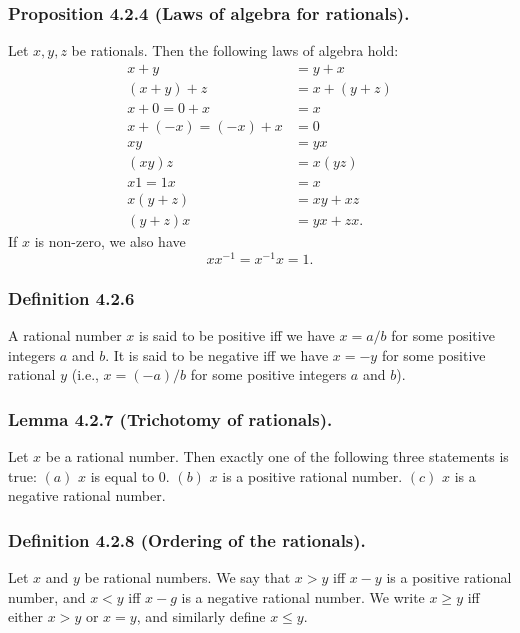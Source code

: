 \documentclass[12pt, letter]{article}
\begin{document}
\subsubsection*{Proposition 4.2.4 (Laws of algebra for rationals).}
Let $x,y,z$ be rationals. Then the following laws of algebra hold:
\begin{equation*}
    \begin{aligned}
        x+y&=y+x\\
        (x+y)+z&=x+(y+z)\\
        x+0=0+x&=x\\
        x+(-x)=(-x)+x&=0\\
        xy&=yx\\
        (xy)z&=x(yz)\\
        x1=1x&=x\\
        x(y+z)&=xy+xz\\
        (y+z)x&=yx+zx.
    \end{aligned}
\end{equation*}
If $x$ is non-zero, we also have
\begin{equation*}
    xx^{-1}=x^{-1}x=1.
\end{equation*}
\subsubsection*{Definition 4.2.6}
A rational number $x$ is said to be positive iff we have $x=a/b$ for some positive integers $a$ and $b$. It is said to be negative iff we have $x=-y$ for some 
positive rational $y$ (i.e., $x=(-a)/b$ for some positive integers $a$ and $b$).
\subsubsection*{Lemma 4.2.7 (Trichotomy of rationals).}
Let $x$ be a rational number. Then exactly one of the following three statements is true: $(a)$ $x$ is equal to 0. $(b)$ $x$ is a positive rational number. $(c)$ $x$ is a negative rational number.
\subsubsection*{Definition 4.2.8 (Ordering of the rationals).}
Let $x$ and $y$ be rational numbers. We say that $x>y$ iff $x-y$ is a positive rational number, and $x<y$ iff $x-g$ is a negative rational number. We write $x\geq y$ iff
either $x>y$ or $x=y$, and similarly define $x\leq y$.
\end{document}
